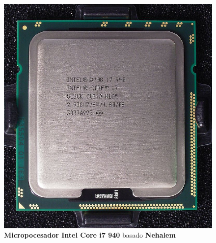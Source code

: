 \begin{figure}[htb]
	\centering
	\includegraphics[scale = 0.2]{Graphics/Intel_core_i7_940_top_R7309478_wp.jpg}
	\caption{\textbf{Micropocesador Intel Core i7 940} basado \textbf{Nehalem}}
	\label{fig:25}
\end{figure}

